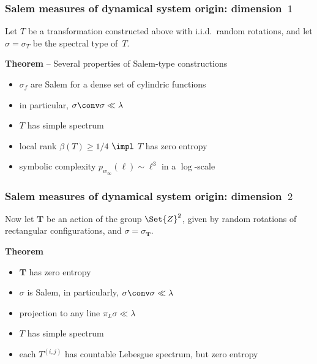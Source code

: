 \begin{frame}
  \frametitle{Salem measures of dynamical system origin: dimension~$1$}
  

  
  
  Let $T$ be a transformation constructed above with i.i.d.\ random rotations,
  and let $\sigma = \sigma_T$ be the spectral type of~$T$. %
  
  \bigskip
  {\bf Theorem} -- Several properties of Salem-type constructions  
  \begin{itemize}
   \item $\sigma_f$ are Salem for a dense set of cylindric functions 
   \item in particular, $\sigma \conv \sigma \ll \lambda$
   \item $T$ has simple spectrum
   \item local rank $\beta(T) \ge 1/4$ $\impl$ $T$ has zero entropy 
   \item symbolic complexity $p_{w_\infty}(\ell) \sim \ell^3$ in a $\log$-scale 
  \end{itemize}

\end{frame}


\def\actionT{{\boldsymbol T}}

\begin{frame}
  \frametitle{Salem measures of dynamical system origin: dimension~$2$}
  
  Now let $\actionT$ be an action of the group $\Set{Z}^2$, 
  given by random rotations of rectangular configurations, 
  and $\sigma = \sigma_\actionT$. 

  \bigskip
  {\bf Theorem} 
  \begin{itemize}
   \item $\actionT$ has zero entropy  
   \item $\sigma$ is Salem, in particularly, $\sigma \conv \sigma \ll \lambda$
   \item projection to any line $\pi_L \sigma \ll \lambda$
   \item $T$ has simple spectrum
   \item each $T^{(i,j)}$ has countable Lebesgue spectrum, but zero entropy 
  \end{itemize}

\end{frame}


